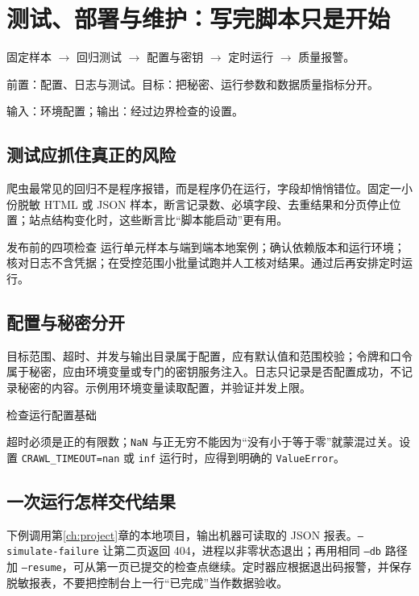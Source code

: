 \chapter{测试、部署与维护：写完脚本只是开始}\label{ch:delivery}
\begin{tcolorbox}[title=章首知识地图,colframe=Ink]
固定样本 $\longrightarrow$ 回归测试 $\longrightarrow$ 配置与密钥 $\longrightarrow$ 定时运行 $\longrightarrow$ 质量报警。
\end{tcolorbox}

\begin{tcolorbox}[title=学习目标与前置知识,colframe=Ink!65,colback=Ink!2]
前置：配置、日志与测试。目标：把秘密、运行参数和数据质量指标分开。\par
输入：环境配置；输出：经过边界检查的设置。
\end{tcolorbox}

\section{测试应抓住真正的风险}
爬虫最常见的回归不是程序报错，而是程序仍在运行，字段却悄悄错位。固定一小份脱敏 HTML 或 JSON 样本，断言记录数、必填字段、去重结果和分页停止位置；站点结构变化时，这些断言比“脚本能启动”更有用。

\begin{method}{发布前的四项检查}
运行单元样本与端到端本地案例；确认依赖版本和运行环境；核对日志不含凭据；在受控范围小批量试跑并人工核对结果。通过后再安排定时运行。
\end{method}

\section{配置与秘密分开}
目标范围、超时、并发与输出目录属于配置，应有默认值和范围校验；令牌和口令属于秘密，应由环境变量或专门的密钥服务注入。日志只记录是否配置成功，不记录秘密的内容。示例用环境变量读取配置，并验证并发上限。

\begin{example}{检查运行配置}{基础}
\end{example}

超时必须是正的有限数；\texttt{NaN} 与正无穷不能因为“没有小于等于零”就蒙混过关。设置 \texttt{CRAWL\_TIMEOUT=nan} 或 \texttt{inf} 运行时，应得到明确的 \texttt{ValueError}。

\section{一次运行怎样交代结果}
下例调用第\ref{ch:project}章的本地项目，输出机器可读取的 JSON 报表。\texttt{--simulate-failure} 让第二页返回 404，进程以非零状态退出；再用相同 \texttt{--db} 路径加 \texttt{--resume}，可从第一页已提交的检查点继续。定时器应根据退出码报警，并保存脱敏报表，不要把控制台上一行“已完成”当作数据验收。

